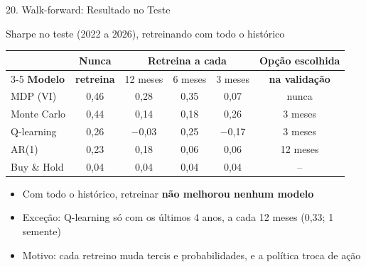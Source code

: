\documentclass[aspectratio=169,10pt,t]{beamer}
\begin{document}
\begin{frame}{20. Walk-forward: Resultado no Teste}

  \begin{block}{Sharpe no teste (2022 a 2026), retreinando com todo o histórico}
    \centering\small
    \setlength{\tabcolsep}{10pt}
    \renewcommand{\arraystretch}{1.12}
    \begin{tabular}{l c ccc c}
      \toprule
      & \textbf{Nunca} & \multicolumn{3}{c}{\textbf{Retreina a cada}} & \textbf{Opção escolhida} \\
      \cmidrule(lr){3-5}
      \textbf{Modelo} & \textbf{retreina} & 12 meses & 6 meses & 3 meses & \textbf{na validação} \\
      \midrule
      MDP (VI)          & 0,46          & 0,28    & 0,35    & 0,07    & nunca \\
      Monte Carlo       & 0,44          & 0,14    & 0,18    & 0,26    & 3 meses \\
      Q-learning        & 0,26          & $-$0,03 & 0,25    & $-$0,17 & 3 meses \\
      AR(1)             & 0,23          & 0,18    & 0,06    & 0,06    & 12 meses \\
      Buy \& Hold       & 0,04          & 0,04    & 0,04    & 0,04    & -- \\
      \bottomrule
    \end{tabular}
  \end{block}

  \small
  \begin{itemize}\setlength{\itemsep}{2pt}
    \item Com todo o histórico, retreinar \textbf{não melhorou nenhum modelo}
    \item Exceção: Q-learning só com os últimos 4 anos, a cada 12 meses (0,33; 1 semente)
    \item Motivo: cada retreino muda tercis e probabilidades, e a política troca de ação
  \end{itemize}

\end{frame}
\end{document}
